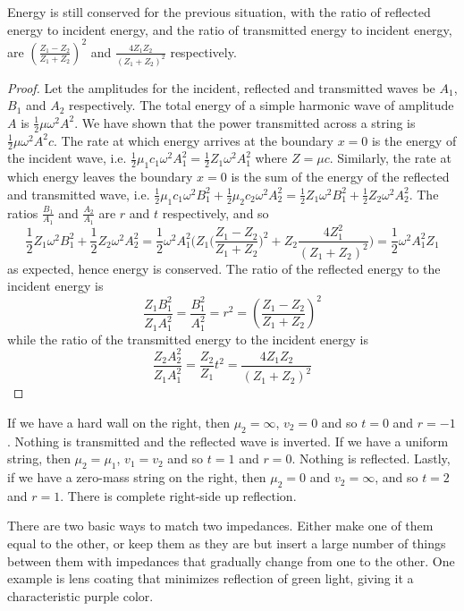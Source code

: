 \documentclass[a4paper]{article}
\begin{document}
\begin{cor}
Energy is still conserved for the previous situation, with the ratio of reflected energy to incident energy, and the ratio of transmitted energy to incident energy, are $(\frac{Z_1-Z_2}{Z_1+Z_2})^2$ and $\frac{4Z_1Z_2}{(Z_1+Z_2)^2}$ respectively.
\end{cor}
\begin{proof}
Let the amplitudes for the incident, reflected and transmitted waves be $A_1$, $B_1$ and $A_2$ respectively. The total energy of a simple harmonic wave of amplitude $A$ is $\frac{1}{2}\mu\omega^2A^2$. We have shown that the power transmitted across a string is $\frac{1}{2}\mu\omega^2A^2c$. The rate at which energy arrives at the boundary $x=0$ is the energy of the incident wave, i.e. $\frac{1}{2}\mu_1c_1\omega^2A_1^2=\frac{1}{2}Z_1\omega^2A_1^2$ where $Z=\mu c$. Similarly, the rate at which energy leaves the boundary $x=0$ is the sum of the energy of the reflected and transmitted wave, i.e. $\frac{1}{2}\mu_1c_1\omega^2B_1^2+\frac{1}{2}\mu_2c_2\omega^2A_2^2=\frac{1}{2}Z_1\omega^2B_1^2+\frac{1}{2}Z_2\omega^2A_2^2$. The ratios $\frac{B_1}{A_1}$ and $\frac{A_2}{A_1}$ are $r$ and $t$ respectively, and so
$$\frac{1}{2}Z_1\omega^2B_1^2+\frac{1}{2}Z_2\omega^2A_2^2=\frac{1}{2}\omega^2A_1^2\bigg(Z_1\bigg(\frac{Z_1-Z_2}{Z_1+Z_2}\bigg)^2+Z_2\frac{4Z_1^2}{(Z_1+Z_2)^2}\bigg)=\frac{1}{2}\omega^2A_1^2Z_1$$
as expected, hence energy is conserved. The ratio of the reflected energy to the incident energy is $$\frac{Z_1B_1^2}{Z_1A_1^2}=\frac{B_1^2}{A_1^2}=r^2=(\frac{Z_1-Z_2}{Z_1+Z_2})^2$$ while the ratio of the transmitted energy to the incident energy is $$\frac{Z_2A_2^2}{Z_1A_1^2}=\frac{Z_2}{Z_1}t^2=\frac{4Z_1Z_2}{(Z_1+Z_2)^2}$$
\end{proof}
\begin{eg}
If we have a hard wall on the right, then $\mu_2=\infty$, $v_2=0$ and so $t=0$ and $r=-1$. Nothing is transmitted and the reflected wave is inverted. If we have a uniform string, then $\mu_2=\mu_1$, $v_1=v_2$ and so $t=1$ and $r=0$. Nothing is reflected. Lastly, if we have a zero-mass string on the right, then $\mu_2=0$ and $v_2=\infty$, and so $t=2$ and $r=1$. There is complete right-side up reflection.
\end{eg}
\begin{Note}
There are two basic ways to match two impedances. Either make one of them equal to the other, or keep them as they are but insert a large number of things between them with impedances that gradually change from one to the other. One example is lens coating that minimizes reflection of green light, giving it a characteristic purple color.
\end{Note}
\end{document}
